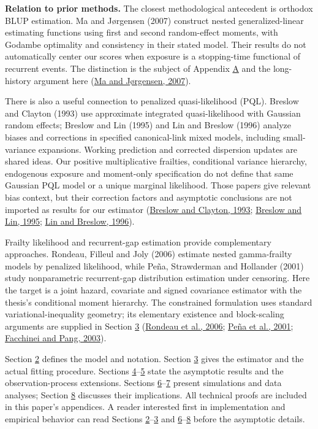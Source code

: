 \documentclass[11pt]{article}
\begin{document}
\textbf{Relation to prior methods.} The closest methodological antecedent is orthodox BLUP estimation. Ma and Jørgensen (2007) construct nested generalized-linear estimating functions using first and second random-effect moments, with Godambe optimality and consistency in their stated model. Their results do not automatically center our scores when exposure is a stopping-time functional of recurrent events. The distinction is the subject of Appendix \hyperref[sec:A]{A} and the long-history argument here (\hyperref[ref:6]{Ma and Jørgensen, 2007}).

There is also a useful connection to penalized quasi-likelihood (PQL). Breslow and Clayton (1993) use approximate integrated quasi-likelihood with Gaussian random effects; Breslow and Lin (1995) and Lin and Breslow (1996) analyze biases and corrections in specified canonical-link mixed models, including small-variance expansions. Working prediction and corrected dispersion updates are shared ideas. Our positive multiplicative frailties, conditional variance hierarchy, endogenous exposure and moment-only specification do not define that same Gaussian PQL model or a unique marginal likelihood. Those papers give relevant bias context, but their correction factors and asymptotic conclusions are not imported as results for our estimator (\hyperref[ref:7]{Breslow and Clayton, 1993}; \hyperref[ref:8]{Breslow and Lin, 1995}; \hyperref[ref:9]{Lin and Breslow, 1996}).

Frailty likelihood and recurrent-gap estimation provide complementary approaches. Rondeau, Filleul and Joly (2006) estimate nested gamma-frailty models by penalized likelihood, while Peña, Strawderman and Hollander (2001) study nonparametric recurrent-gap distribution estimation under censoring. Here the target is a joint hazard, covariate and signed covariance estimator with the thesis's conditional moment hierarchy. The constrained formulation uses standard variational-inequality geometry; its elementary existence and block-scaling arguments are supplied in Section \hyperref[sec:3]{3} (\hyperref[ref:10]{Rondeau et al., 2006}; \hyperref[ref:11]{Peña et al., 2001}; \hyperref[ref:12]{Facchinei and Pang, 2003}).

Section \hyperref[sec:2]{2} defines the model and notation. Section \hyperref[sec:3]{3} gives the estimator and the actual fitting procedure. Sections \hyperref[sec:4]{4}--\hyperref[sec:5]{5} state the asymptotic results and the observation-process extensions. Sections \hyperref[sec:6]{6}--\hyperref[sec:7]{7} present simulations and data analyses; Section \hyperref[sec:8]{8} discusses their implications. All technical proofs are included in this paper's appendices. A reader interested first in implementation and empirical behavior can read Sections \hyperref[sec:2]{2}--\hyperref[sec:3]{3} and \hyperref[sec:6]{6}--\hyperref[sec:8]{8} before the asymptotic details.
\end{document}
